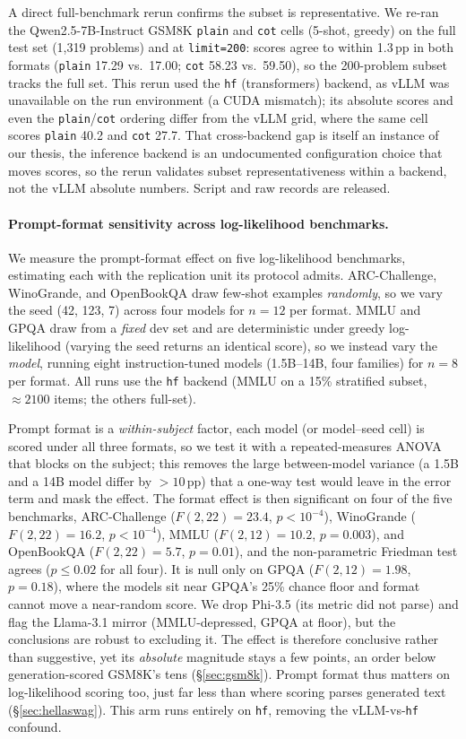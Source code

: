 \documentclass[11pt]{article}
\begin{document}
A direct full-benchmark rerun confirms the subset is representative. We re-ran the
Qwen2.5-7B-Instruct GSM8K \texttt{plain} and \texttt{cot} cells (5-shot, greedy) on
the full test set (1{,}319 problems) and at \texttt{limit=200}: scores agree to
within 1.3\,pp in both formats (\texttt{plain} 17.29 vs.\ 17.00; \texttt{cot} 58.23
vs.\ 59.50), so the 200-problem subset tracks the full set. This rerun used the
\texttt{hf} (transformers) backend, as vLLM was unavailable on the run environment
(a CUDA mismatch); its absolute scores and even the \texttt{plain}/\texttt{cot}
ordering differ from the vLLM grid, where the same cell scores \texttt{plain} 40.2
and \texttt{cot} 27.7. That cross-backend gap is itself an instance of our
thesis, the inference backend is an undocumented configuration choice that moves
scores, so the rerun validates subset representativeness within a backend, not the
vLLM absolute numbers. Script and raw records are released.

\paragraph{Prompt-format sensitivity across log-likelihood benchmarks.} We measure
the prompt-format effect on five log-likelihood benchmarks, estimating each with the
replication unit its protocol admits. ARC-Challenge, WinoGrande, and OpenBookQA draw
few-shot examples \emph{randomly}, so we vary the seed (42, 123, 7) across four
models for $n{=}12$ per format. MMLU and GPQA draw from a \emph{fixed} dev set and
are deterministic under greedy log-likelihood (varying the seed returns an identical
score), so we instead vary the \emph{model}, running eight instruction-tuned models
(1.5B--14B, four families) for $n{=}8$ per format. All runs use the \texttt{hf}
backend (MMLU on a 15\% stratified subset, ${\approx}2100$ items; the others
full-set).

Prompt format is a \emph{within-subject} factor, each model (or model--seed cell)
is scored under all three formats, so we test it with a repeated-measures ANOVA that
blocks on the subject; this removes the large between-model variance (a 1.5B and a
14B model differ by ${>}10$\,pp) that a one-way test would leave in the error term
and mask the effect. The format effect is then significant on four of the five
benchmarks, ARC-Challenge ($F(2,22)=23.4$, $p<10^{-4}$), WinoGrande
($F(2,22)=16.2$, $p<10^{-4}$), MMLU ($F(2,12)=10.2$, $p=0.003$), and OpenBookQA
($F(2,22)=5.7$, $p=0.01$), and the non-parametric Friedman test agrees ($p\le0.02$
for all four). It is null only on GPQA ($F(2,12)=1.98$, $p=0.18$), where the models
sit near GPQA's 25\% chance floor and format cannot move a near-random score. We
drop Phi-3.5 (its metric did not parse) and flag the Llama-3.1 mirror
(MMLU-depressed, GPQA at floor), but the conclusions are robust to excluding it. The
effect is therefore conclusive rather than suggestive, yet its \emph{absolute}
magnitude stays a few points, an order below generation-scored GSM8K's tens (\S\ref{sec:gsm8k}).
Prompt format thus matters on log-likelihood scoring too, just far less than where
scoring parses generated text (\S\ref{sec:hellaswag}). This arm runs entirely on
\texttt{hf}, removing the vLLM-vs-\texttt{hf} confound.
\end{document}
